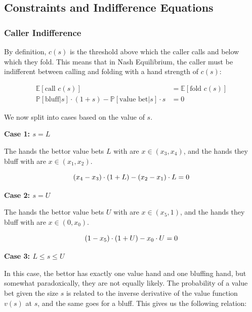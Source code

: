 \documentclass[a4paper,12pt]{article}
\theoremstyle{plain}
\theoremstyle{definition}
\begin{document}


\subsection{Constraints and Indifference Equations}

\subsubsection{Caller Indifference}
\label{subsec:caller_indifference}

By definition, $c(s)$ is the threshold above which the caller calls and below which they fold. This means that in Nash Equilibrium, the caller must be indifferent between calling and folding with a hand strength of $c(s)$:

\begin{align*}
    \mathbb{E}[\text{call } c(s)] & = \mathbb{E}[\text{fold } c(s)]\\
    \mathbb{P}[\text{bluff} | s] \cdot (1+s) - \mathbb{P}[\text{value bet} | s]\cdot s & = 0 
\end{align*}

We now split into cases based on the value of $s$.


\textbf{Case 1: $s = L$}

The hands the bettor value bets $L$ with are $x \in (x_3, x_4)$, and the hands they bluff with are $x \in (x_1, x_2)$. 

\begin{equation}{\label{callindiffmin}}
    (x_4-x_3) \cdot (1+L) - (x_2-x_1) \cdot L = 0
\end{equation}

\textbf{Case 2: $s = U$}

The hands the bettor value bets $U$ with are $x \in (x_5, 1)$, and the hands they bluff with are $x \in (0, x_0)$. 

\begin{equation}{\label{callindiffmax}}
    (1-x_5) \cdot (1+U) - x_0 \cdot U = 0
\end{equation}


\textbf{Case 3: $L \leq s \leq U$}

In this case, the bettor has exactly one value hand and one bluffing hand, but somewhat paradoxically, they are not equally likely. The probability of a value bet given the size $s$ is related to the inverse derivative of the value function $v(s)$ at $s$, and the same goes for a bluff. This gives us the following relation:
\end{document}
